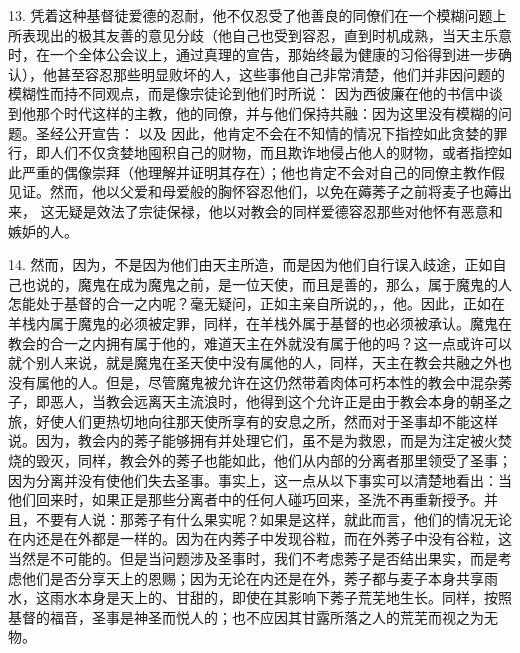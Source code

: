 13. 凭着这种基督徒爱德的忍耐，他不仅忍受了他善良的同僚们在一个模糊问题上所表现出的极其友善的意见分歧（他自己也受到容忍，直到时机成熟，当天主乐意时，在一个全体公会议上，通过真理的宣告，那始终最为健康的习俗得到进一步确认），他甚至容忍那些明显败坏的人，这些事他自己非常清楚，他们并非因问题的模糊性而持不同观点，而是像宗徒论到他们时所说： 因为西彼廉在他的书信中谈到他那个时代这样的主教，他的同僚，并与他们保持共融：因为这里没有模糊的问题。圣经公开宣告： 以及 因此，他肯定不会在不知情的情况下指控如此贪婪的罪行，即人们不仅贪婪地囤积自己的财物，而且欺诈地侵占他人的财物，或者指控如此严重的偶像崇拜（他理解并证明其存在）；他也肯定不会对自己的同僚主教作假见证。然而，他以父爱和母爱般的胸怀容忍他们，以免在薅莠子之前将麦子也薅出来， 这无疑是效法了宗徒保禄，他以对教会的同样爱德容忍那些对他怀有恶意和嫉妒的人。\par

14. 然而，因为，不是因为他们由天主所造，而是因为他们自行误入歧途，正如自己也说的，魔鬼在成为魔鬼之前，是一位天使，而且是善的，那么，属于魔鬼的人怎能处于基督的合一之内呢？毫无疑问，正如主亲自所说的，，他。因此，正如在羊栈内属于魔鬼的必须被定罪，同样，在羊栈外属于基督的也必须被承认。魔鬼在教会的合一之内拥有属于他的，难道天主在外就没有属于他的吗？这一点或许可以就个别人来说，就是魔鬼在圣天使中没有属他的人，同样，天主在教会共融之外也没有属他的人。但是，尽管魔鬼被允许在这仍然带着肉体可朽本性的教会中混杂莠子，即恶人，当教会远离天主流浪时，他得到这个允许正是由于教会本身的朝圣之旅，好使人们更热切地向往那天使所享有的安息之所，然而对于圣事却不能这样说。因为，教会内的莠子能够拥有并处理它们，虽不是为救恩，而是为注定被火焚烧的毁灭，同样，教会外的莠子也能如此，他们从内部的分离者那里领受了圣事；因为分离并没有使他们失去圣事。事实上，这一点从以下事实可以清楚地看出：当他们回来时，如果正是那些分离者中的任何人碰巧回来，圣洗不再重新授予。并且，不要有人说：那莠子有什么果实呢？如果是这样，就此而言，他们的情况无论在内还是在外都是一样的。因为在内莠子中发现谷粒，而在外莠子中没有谷粒，这当然是不可能的。但是当问题涉及圣事时，我们不考虑莠子是否结出果实，而是考虑他们是否分享天上的恩赐；因为无论在内还是在外，莠子都与麦子本身共享雨水，这雨水本身是天上的、甘甜的，即使在其影响下莠子荒芜地生长。同样，按照基督的福音，圣事是神圣而悦人的；也不应因其甘露所落之人的荒芜而视之为无物。\par

